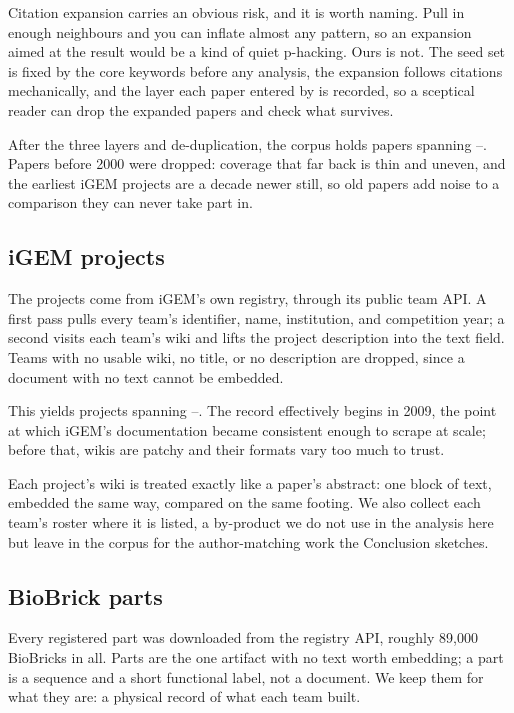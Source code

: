 \documentclass[12pt,a4paper]{article}
\begin{document}
	Citation expansion carries an obvious risk, and it is worth naming. Pull in enough
	neighbours and you can inflate almost any pattern, so an expansion aimed at the
	result would be a kind of quiet p-hacking. Ours is not. The seed set is fixed by
	the core keywords before any analysis, the expansion follows citations
	mechanically, and the layer each paper entered by is recorded, so a sceptical
	reader can drop the expanded papers and check what survives.
	
	After the three layers and de-duplication, the corpus holds \statNPapersTotal{}
	papers spanning \statPaperYearMin{}--\statPaperYearMax{}. Papers before 2000 were
	dropped: coverage that far back is thin and uneven, and the earliest iGEM projects
	are a decade newer still, so old papers add noise to a comparison they can never
	take part in.
	
	\subsection{iGEM projects}
	
	The projects come from iGEM's own registry, through its public team API. A first
	pass pulls every team's identifier, name, institution, and competition year; a
	second visits each team's wiki and lifts the project description into the text
	field. Teams with no usable wiki, no title, or no description are dropped, since a
	document with no text cannot be embedded.
	
	This yields \statNProjectsTotal{} projects spanning
	\statProjectYearMin{}--\statProjectYearMax{}. The record effectively begins in
	2009, the point at which iGEM's documentation became consistent enough to scrape
	at scale; before that, wikis are patchy and their formats vary too much to trust.
	
	Each project's wiki is treated exactly like a paper's abstract: one block of text,
	embedded the same way, compared on the same footing. We also collect each team's
	roster where it is listed, a by-product we do not use in the analysis here but
	leave in the corpus for the author-matching work the Conclusion sketches.
	
	\subsection{BioBrick parts}
	
	Every registered part was downloaded from the registry API, roughly 89{,}000
	BioBricks in all. Parts are the one artifact with no text worth embedding; a part
	is a sequence and a short functional label, not a document. We keep them for what
	they are: a physical record of what each team built.
	
\end{document}
